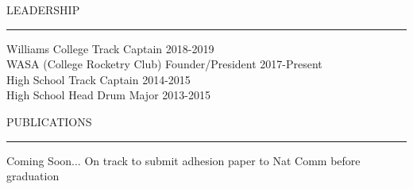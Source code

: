 \documentclass{resume} %
\renewenvironment{rSection}[1]{
	\sectionskip
	\textcolor{RoyalPurple}{\MakeUppercase{#1}}
	\sectionlineskip
	\hrule
	\begin{list}{}{
			\setlength{\leftmargin}{1.5em}
		}
		\item[]
	}{
	\end{list}
}
\begin{document}
		\begin{rSection}{Leadership} \itemsep -2pt
		{Williams College Track Captain} \hfill {2018-2019} \\
		{WASA (College Rocketry Club) Founder/President} \hfill {2017-Present} \\
		{High School Track Captain} \hfill {2014-2015}  \\
		{High School Head Drum Major} \hfill {2013-2015}  \\
		

		
		
	\end{rSection}
	
	
	
%	
	



\begin{rSection}{Publications} \itemsep -2pt
	Coming Soon... On track to submit adhesion paper to Nat Comm before graduation
\end{rSection}	

\end{document}

